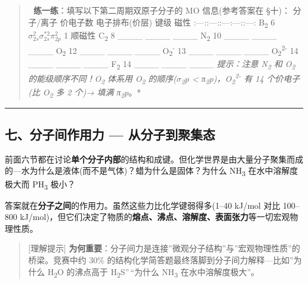 \begin{quote}
📝 \textbf{练一练}：填写以下第二周期双原子分子的 MO 信息(参考答案在 §十)：
\textbar{} 分子/离子 \textbar{} 价电子数 \textbar{} 电子排布(价层) \textbar{} 键级 \textbar{} 磁性 \textbar{}
\textbar:---:\textbar:---:\textbar:---\textbar:---:\textbar:---:\textbar{}
\textbar{} B\textsubscript{2} \textbar{} 6 \textbar{} \(\sigma_{2s}^2 \sigma_{2s}^{*2} \pi_{2p}^2\) \textbar{} 1 \textbar{} 顺磁性 \textbar{}
\textbar{} C\textsubscript{2} \textbar{} 8 \textbar{} \_\_\_\_ \textbar{} \_\_\_\_ \textbar{} \_\_\_\_ \textbar{}
\textbar{} N\textsubscript{2} \textbar{} 10 \textbar{} \_\_\_\_ \textbar{} \_\_\_\_ \textbar{} \_\_\_\_ \textbar{}
\textbar{} O\textsubscript{2} \textbar{} 12 \textbar{} \_\_\_\_ \textbar{} \_\_\_\_ \textbar{} \_\_\_\_ \textbar{}
\textbar{} O\textsubscript{2}\textsuperscript{-} \textbar{} 13 \textbar{} \_\_\_\_ \textbar{} \_\_\_\_ \textbar{} \_\_\_\_ \textbar{}
\textbar{} O\textsubscript{2}\textsuperscript{2-} \textbar{} 14 \textbar{} \_\_\_\_ \textbar{} \_\_\_\_ \textbar{} \_\_\_\_ \textbar{}
\textbar{} F\textsubscript{2} \textbar{} 14 \textbar{} \_\_\_\_ \textbar{} \_\_\_\_ \textbar{} \_\_\_\_ \textbar{}
\emph{提示：注意 N\textsubscript{2} 和 O\textsubscript{2} 的能级顺序不同！O\textsubscript{2} 体系用 O\textsubscript{2} 的顺序(\(\sigma\)\textsubscript{2}p \textless{} π\textsubscript{2}p)，O\textsubscript{2}\textsuperscript{2-} 有 14 个价电子(比 O\textsubscript{2} 多 2 个)→ 填满 π\textsubscript{2}p}。*
\end{quote}

\begin{center}\rule{0.5\linewidth}{0.5pt}\end{center}

\subsection{七、分子间作用力 --- 从分子到聚集态}\label{ux4e03ux5206ux5b50ux95f4ux4f5cux7528ux529b-ux4eceux5206ux5b50ux5230ux805aux96c6ux6001}

前面六节都在讨论\textbf{单个分子内部}的结构和成键。但化学世界是由大量分子聚集而成的---水为什么是液体(而不是气体)？蜡为什么是固体？为什么 NH\textsubscript{3} 在水中溶解度极大而 PH\textsubscript{3} 极小？

答案就在\textbf{分子之间}的作用力。虽然这些力比化学键弱得多(1--40 kJ/mol 对比 100--800 kJ/mol)，但它们决定了物质的\textbf{熔点、沸点、溶解度、表面张力}等一切宏观物理性质。

\begin{quote}
{[}理解提示{]} \textbf{为何重要}：分子间力是连接''微观分子结构''与''宏观物理性质''的桥梁。竞赛中约 30\% 的结构化学简答题最终落脚到分子间力解释---比如''为什么 H\textsubscript{2}O 的沸点高于 H\textsubscript{2}S''\,``为什么 NH\textsubscript{3} 在水中溶解度极大''。
\end{quote}

